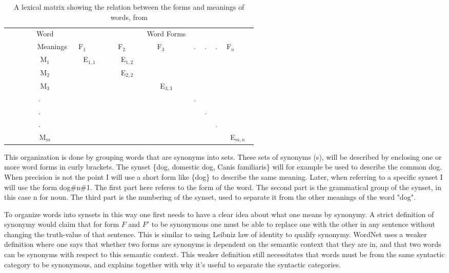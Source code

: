 \begin{table}[ht]
	\centering
	\begin{tabular}{|c||ccccccc|}
		\hline
	        Word     & 	~		 & ~		 & Word Forms & ~ & ~ & ~ & ~		  \\
	        Meanings & F$_1$     & F$_2$     & F$_3$      & . & . & . & F$_n$     \\ \hline
	        M$_1$    & E$_{1,1}$ & E$_{1,2}$ & ~          & ~ & ~ & ~ & ~         \\
	        M$_2$    & ~         & E$_{2,2}$ & ~          & ~ & ~ & ~ & ~         \\
	        M$_3$    & ~         & ~         & E$_{3,3}$  & ~ & ~ & ~ & ~         \\
	        .        & ~         & ~         & ~          & . & ~ & ~ & ~         \\
	        .        & ~         & ~         & ~          & ~ & . & ~ & ~         \\
	        .        & ~         & ~         & ~          & ~ & ~ & . & ~         \\
	        M$_m$    & ~         & ~         & ~          & ~ & ~ & ~ & E$_{m,n}$ \\
		\hline
	\end{tabular}
	\caption{A lexical matrix showing the relation between the forms and meanings of words, from \citet{Miller1990}}
	\label{table:LexicalMatrix}
\end{table}

This organization is done by grouping words that are synonyms into sets.
These sets of synonyms (s), will be described by enclosing one or more word forms in curly brackets.
The synset \{dog, domestic dog, Canis familiaris\} will for example be used to describe the common dog.
When precision is not the point I will use a short form like \{dog\} to describe the same meaning.
Later, when referring to a specific synset I will use the form dog\#n\#1.
The first part here referes to the form of the word.
The second part is the grammatical group of the synset, in this case n for noun.
The third part is the numbering of the synset, used to separate it from the other meanings of the word "dog".

To organize words into synsets in this way one first needs to have a clear idea about what one means by synonymy.
A strict definition of synonymy would claim that for form $F$ and $F'$ to be synonymous one must be able
to replace one with the other in any sentence without changing the truth-value of that sentence.
This is similar to using Leibniz law of identity to qualify synonymy.
WordNet uses a weaker definition where one says that whether two forms are synonyms is dependent on the
semantic context that they are in, and that two words can be synonyms with respect to this semantic context\citep{Miller1990}.
This weaker definition still necessitates that words must be from the same syntactic category to be synonymous,
and explains together with \citet{Fillenbaum1965} why it's useful to separate the syntactic categories.

